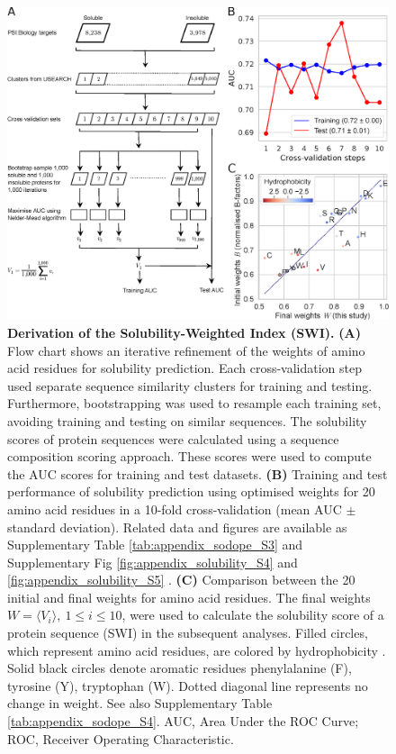 \begin{figure}[!hbtp]
\centerline{\includegraphics[width=1\textwidth]{chapters/Solubility/Figures/fig2.eps}}
\caption[Derivation of the Solubility-Weighted Index (SWI).]{{\bf Derivation of the Solubility-Weighted Index (SWI).} {\bf (A)} Flow chart shows an iterative refinement of the weights of amino acid residues for solubility prediction. Each cross-validation step used separate sequence similarity clusters for training and testing. Furthermore, bootstrapping was used to resample each training set, avoiding training and testing on similar sequences. The solubility scores of protein sequences were calculated using a sequence composition scoring approach. These scores were used to compute the AUC scores for training and test datasets. {\bf (B)} Training and test performance of solubility prediction using optimised weights for 20 amino acid residues in a 10-fold cross-validation (mean AUC $\pm$ standard deviation). Related data and figures are available as Supplementary Table \ref{tab:appendix_sodope_S3} and Supplementary Fig \ref{fig:appendix_solubility_S4} and \ref{fig:appendix_solubility_S5} . {\bf (C)} Comparison between the 20 initial and final weights for amino acid residues. The final weights $W = \langle V_i \rangle,\ 1\leq i\leq 10 $, were used to calculate the solubility score of a protein sequence (SWI) in the subsequent analyses. Filled circles, which represent amino acid residues, are colored by hydrophobicity \citep{Kyte1982-qn}. Solid black circles denote aromatic residues phenylalanine (F), tyrosine (Y), tryptophan (W). Dotted diagonal line represents no change in weight. See also Supplementary Table \ref{tab:appendix_sodope_S4}. AUC, Area Under the ROC Curve; ROC, Receiver Operating Characteristic.}\label{fig:solubility_02}
\end{figure}

